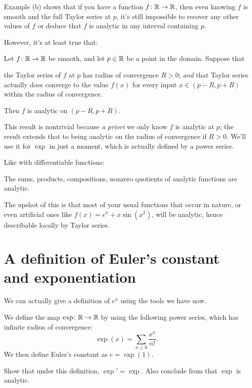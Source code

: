 Example (b) shows that if you have a function $f \colon \mathbb R \to \mathbb R$,
then even knowing $f$ is smooth and the full Taylor series at $p$,
it's still impossible to recover any other values of $f$
or deduce that $f$ is analytic in any interval containing $p$.

However, it's at least true that:
\begin{proposition}
	Let $f \colon \mathbb R \to \mathbb R$ be smooth, and let $p \in \mathbb R$ be a point in the domain.
	Suppose that
	\begin{itemize}
		\ii the Taylor series of $f$ at $p$ has radius of convergence $R > 0$; \emph{and}
		\ii that Taylor series actually does converge to the value $f(x)$
		for every input $x \in (p-R,p+R)$ within the radius of convergence.
	\end{itemize}
	Then $f$ is analytic on $(p-R, p+R)$.
	\label{prop:taylor_series_are_analytic}
\end{proposition}
This result is nontrivial because \emph{a priori} we only know $f$ is analytic at $p$;
the result extends that to being analytic on the radius of convergence if $R > 0$.
We'll use it for $\exp$ in just a moment, which is actually defined by a power series.

Like with differentiable functions:
\begin{proposition}
	The sums, products, compositions, nonzero quotients
	of analytic functions are analytic.
\end{proposition}
The upshot of this is that most of your usual
functions that occur in nature,
or even artificial ones like $f(x) = e^x + x \sin(x^2)$,
will be analytic, hence describable locally by Taylor series.

\section{A definition of Euler's constant and exponentiation}
We can actually give a definition of $e^x$ using the tools we have now.

\begin{definition}
	We define the map $\exp \colon \mathbb R \to \mathbb R$ by using the following power series,
	which has infinite radius of convergence:
	\[ \exp(x) = \sum_{n \ge 0} \frac{x^n}{n!}. \]
	We then define Euler's constant as $e = \exp(1)$.
\end{definition}
\begin{ques}
	Show that under this definition, $\exp' = \exp$.
	Also conclude from  that $\exp$ is analytic.
\end{ques}

